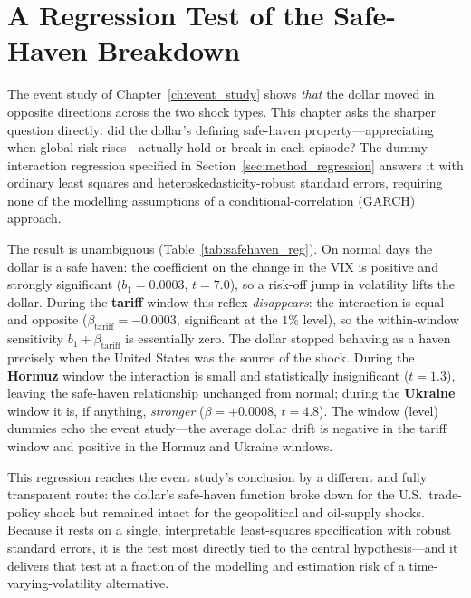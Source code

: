 
\chapter{A Regression Test of the Safe-Haven Breakdown}
\label{ch:regression}

The event study of Chapter~\ref{ch:event_study} shows \emph{that} the dollar moved in
opposite directions across the two shock types. This chapter asks the sharper question
directly: did the dollar's defining safe-haven property---appreciating when global risk
rises---actually hold or break in each episode? The dummy-interaction regression specified in
Section~\ref{sec:method_regression} answers it with ordinary least squares and
heteroskedasticity-robust standard errors, requiring none of the modelling assumptions of a
conditional-correlation (GARCH) approach.



The result is unambiguous (Table~\ref{tab:safehaven_reg}). On normal days the dollar is a
safe haven: the coefficient on the change in the VIX is positive and strongly significant
($b_1 = 0.0003$, $t=7.0$), so a risk-off jump in volatility lifts the dollar. During the
\textbf{tariff} window this reflex \emph{disappears}: the interaction is equal and opposite
($\beta_{\text{tariff}} = -0.0003$, significant at the $1\%$ level), so the within-window
sensitivity $b_1+\beta_{\text{tariff}}$ is essentially zero. The dollar stopped behaving as a
haven precisely when the United States was the source of the shock. During the
\textbf{Hormuz} window the interaction is small and statistically insignificant ($t=1.3$),
leaving the safe-haven relationship unchanged from normal; during the \textbf{Ukraine}
window it is, if anything, \emph{stronger} ($\beta=+0.0008$, $t=4.8$). The window (level)
dummies echo the event study---the average dollar drift is negative in the tariff window and
positive in the Hormuz and Ukraine windows.

This regression reaches the event study's conclusion by a different and fully transparent
route: the dollar's safe-haven function broke down for the U.S.\ trade-policy shock but
remained intact for the geopolitical and oil-supply shocks. Because it rests on a single,
interpretable least-squares specification with robust standard errors, it is the test most
directly tied to the central hypothesis---and it delivers that test at a fraction of the
modelling and estimation risk of a time-varying-volatility alternative.
